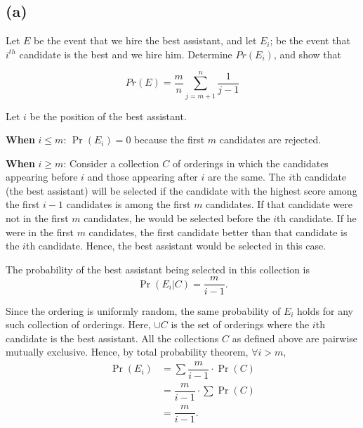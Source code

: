 \documentclass{article}
\begin{document}
\subsection*{(a)}

\begin{tcolorbox}
    Let $E$ be the event that we hire the best assistant, and let $E_i$; be the event that $i^{th}$
    candidate is the best and we hire him. Determine $Pr(E_i)$, and show that

    \begin{equation*}
        Pr(E) = \dfrac{m}{n} \sum_{j=m+1}^n \dfrac{1}{j-1}
    \end{equation*}
\end{tcolorbox}

Let $i$ be the position of the best assistant.

\textbf{When} $i \le m$: $\Pr(E_i)=0$ because the first $m$ candidates are rejected. 

\textbf{When} $i \ge m$: Consider a collection $C$ of orderings in which the candidates appearing before $i$ and those appearing after $i$ are the same. The $i$th candidate (the best assistant) will be selected if the candidate with the highest score among the first $i-1$ candidates is among the first $m$ candidates. If that candidate were not in the first $m$ candidates, he would be selected before the $i$th candidate. If he were in the first $m$ candidates, the first candidate better than that candidate is the $i$th candidate. Hence, the best assistant would be selected in this case.

The probability of the best assistant being selected in this collection is
\begin{equation}
    \Pr(E_i | C) = \dfrac{m}{i-1}.
\end{equation}


Since the ordering is uniformly random, the same probability of $E_i$ holds for any such collection of orderings. Here, $\cup C$ is the set of orderings where the $i$th candidate is the best assistant. All the collections $C$ as defined above are pairwise mutually exclusive. Hence, by total probability theorem, $\forall i>m$,
\begin{equation}
    \begin{aligned}
        \Pr(E_i) &= \sum\dfrac{m}{i-1}\cdot \Pr(C) \\
        &= \dfrac{m}{i-1}\cdot\sum \Pr(C) \\
        &= \dfrac{m}{i-1}.
    \end{aligned}
\end{equation}
\end{document}
